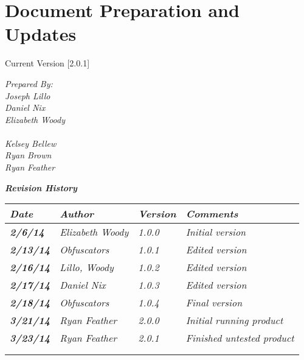 
\chapter{Document Preparation and Updates}

Current Version [2.0.1]
\vspace*{5mm}

{\color{MSBlue3}
\noindent
\textit{Prepared By:}\\
\textit{Joseph Lillo}\\
\textit{Daniel Nix}\\
\textit{Elizabeth Woody}\\ 
\\
\textit{Kelsey Bellew}\\
\textit{Ryan Brown}\\
\textit{Ryan Feather}\\
}

\vfill
\noindent
{\color{color02} \textit{\textbf{Revision History}}}\\
\begin{tabular}{|>{\raggedright}p{1.5cm}|>{\raggedright}p{3cm}|>{\raggedright}p{1.5cm}|>{\raggedright}p{9cm}|}
\hline
\textit{\textbf{Date}} &  \textit{\textbf{Author}} & \textit{\textbf{Version}} & \textit{\textbf{Comments}}\tabularnewline
\hline
 \textit{\textbf{2/6/14}} & \textit{Elizabeth Woody} & \textit{1.0.0} & \textit{Initial version}\tabularnewline
\hline
\textit{\textbf{2/13/14}} & \textit{Obfuscators} & \textit{1.0.1} & \textit{Edited version}\tabularnewline
\hline
 \textit{\textbf{2/16/14}} & \textit{Lillo, Woody} & \textit{1.0.2} & \textit{Edited version}\tabularnewline
 \hline
 \textit{\textbf{2/17/14}} & \textit{Daniel Nix} & \textit{1.0.3} & \textit{Edited version}\tabularnewline
\hline
 \textit{\textbf{2/18/14}} & \textit{Obfuscators} & \textit{1.0.4} & \textit{Final version}\tabularnewline
 \hline
 \textit{\textbf{3/21/14}} & \textit{Ryan Feather} & \textit{2.0.0} & \textit{Initial running product}\tabularnewline
\hline
 \textit{\textbf{3/23/14}} & \textit{Ryan Feather} & \textit{2.0.1} & \textit{Finished untested product}\tabularnewline

\hline
 &  &  & \tabularnewline
\hline
 &  &  & \tabularnewline
\hline
\end{tabular}
\vfill

